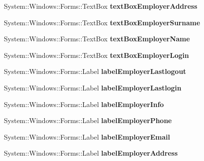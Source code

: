 \begin{DoxyCompactItemize}
System\+::\+Windows\+::\+Forms\+::\+Text\+Box {\bfseries text\+Box\+Employer\+Address}
\item 
\hypertarget{class_magazyn_1_1_magazin_a9ecdcb519355c591bfaef492f0cc77d3}{}\label{class_magazyn_1_1_magazin_a9ecdcb519355c591bfaef492f0cc77d3} 
System\+::\+Windows\+::\+Forms\+::\+Text\+Box {\bfseries text\+Box\+Employer\+Surname}
\item 
\hypertarget{class_magazyn_1_1_magazin_a008d98415e7f04ee589eb3d0dfd8731f}{}\label{class_magazyn_1_1_magazin_a008d98415e7f04ee589eb3d0dfd8731f} 
System\+::\+Windows\+::\+Forms\+::\+Text\+Box {\bfseries text\+Box\+Employer\+Name}
\item 
\hypertarget{class_magazyn_1_1_magazin_a22961725b6c8d528588dc1f6dcc95fb6}{}\label{class_magazyn_1_1_magazin_a22961725b6c8d528588dc1f6dcc95fb6} 
System\+::\+Windows\+::\+Forms\+::\+Text\+Box {\bfseries text\+Box\+Employer\+Login}
\item 
\hypertarget{class_magazyn_1_1_magazin_a94ff44fccd77dc3cc65fafd582658f19}{}\label{class_magazyn_1_1_magazin_a94ff44fccd77dc3cc65fafd582658f19} 
System\+::\+Windows\+::\+Forms\+::\+Label {\bfseries label\+Employer\+Lastlogout}
\item 
\hypertarget{class_magazyn_1_1_magazin_a4641f8fc5f16596a8815b7b8003ec5ec}{}\label{class_magazyn_1_1_magazin_a4641f8fc5f16596a8815b7b8003ec5ec} 
System\+::\+Windows\+::\+Forms\+::\+Label {\bfseries label\+Employer\+Lastlogin}
\item 
\hypertarget{class_magazyn_1_1_magazin_a6a5860d0217df94ea8e6e6fd90193296}{}\label{class_magazyn_1_1_magazin_a6a5860d0217df94ea8e6e6fd90193296} 
System\+::\+Windows\+::\+Forms\+::\+Label {\bfseries label\+Employer\+Info}
\item 
\hypertarget{class_magazyn_1_1_magazin_a1c6320f89fb256d51360e34ae84d8c07}{}\label{class_magazyn_1_1_magazin_a1c6320f89fb256d51360e34ae84d8c07} 
System\+::\+Windows\+::\+Forms\+::\+Label {\bfseries label\+Employer\+Phone}
\item 
\hypertarget{class_magazyn_1_1_magazin_a4f8a58e3559fedb5502164769c61ae5b}{}\label{class_magazyn_1_1_magazin_a4f8a58e3559fedb5502164769c61ae5b} 
System\+::\+Windows\+::\+Forms\+::\+Label {\bfseries label\+Employer\+Email}
\item 
\hypertarget{class_magazyn_1_1_magazin_a7a9c678d0ba207ec2d851c092b1cd066}{}\label{class_magazyn_1_1_magazin_a7a9c678d0ba207ec2d851c092b1cd066} 
System\+::\+Windows\+::\+Forms\+::\+Label {\bfseries label\+Employer\+Address}
\item 
\hypertarget{class_magazyn_1_1_magazin_a0fd14904318f142e205db044e66c9c52}{}\label{class_magazyn_1_1_magazin_a0fd14904318f142e205db044e66c9c52} 

\end{DoxyCompactItemize}
